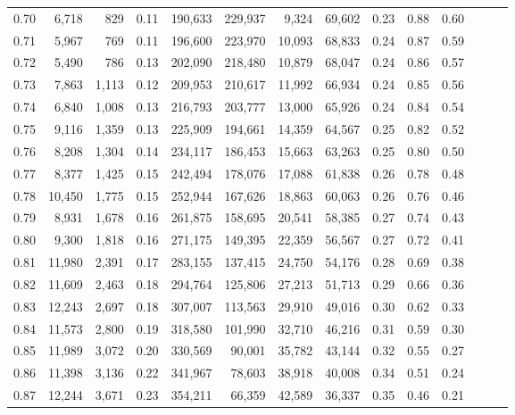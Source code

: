 \begin{tabular}{rrrrrrrrrrrrrr}
0.70 &   6,718 &    829 &  0.11 &  190,633 &  229,937 &   9,324 &  69,602 &  0.23 &  0.88 &      0.60 \\
0.71 &   5,967 &    769 &  0.11 &  196,600 &  223,970 &  10,093 &  68,833 &  0.24 &  0.87 &      0.59 \\
0.72 &   5,490 &    786 &  0.13 &  202,090 &  218,480 &  10,879 &  68,047 &  0.24 &  0.86 &      0.57 \\
0.73 &   7,863 &  1,113 &  0.12 &  209,953 &  210,617 &  11,992 &  66,934 &  0.24 &  0.85 &      0.56 \\
0.74 &   6,840 &  1,008 &  0.13 &  216,793 &  203,777 &  13,000 &  65,926 &  0.24 &  0.84 &      0.54 \\
0.75 &   9,116 &  1,359 &  0.13 &  225,909 &  194,661 &  14,359 &  64,567 &  0.25 &  0.82 &      0.52 \\
0.76 &   8,208 &  1,304 &  0.14 &  234,117 &  186,453 &  15,663 &  63,263 &  0.25 &  0.80 &      0.50 \\
0.77 &   8,377 &  1,425 &  0.15 &  242,494 &  178,076 &  17,088 &  61,838 &  0.26 &  0.78 &      0.48 \\
0.78 &  10,450 &  1,775 &  0.15 &  252,944 &  167,626 &  18,863 &  60,063 &  0.26 &  0.76 &      0.46 \\
0.79 &   8,931 &  1,678 &  0.16 &  261,875 &  158,695 &  20,541 &  58,385 &  0.27 &  0.74 &      0.43 \\
0.80 &   9,300 &  1,818 &  0.16 &  271,175 &  149,395 &  22,359 &  56,567 &  0.27 &  0.72 &      0.41 \\
0.81 &  11,980 &  2,391 &  0.17 &  283,155 &  137,415 &  24,750 &  54,176 &  0.28 &  0.69 &      0.38 \\
0.82 &  11,609 &  2,463 &  0.18 &  294,764 &  125,806 &  27,213 &  51,713 &  0.29 &  0.66 &      0.36 \\
0.83 &  12,243 &  2,697 &  0.18 &  307,007 &  113,563 &  29,910 &  49,016 &  0.30 &  0.62 &      0.33 \\
0.84 &  11,573 &  2,800 &  0.19 &  318,580 &  101,990 &  32,710 &  46,216 &  0.31 &  0.59 &      0.30 \\
0.85 &  11,989 &  3,072 &  0.20 &  330,569 &   90,001 &  35,782 &  43,144 &  0.32 &  0.55 &      0.27 \\
0.86 &  11,398 &  3,136 &  0.22 &  341,967 &   78,603 &  38,918 &  40,008 &  0.34 &  0.51 &      0.24 \\
0.87 &  12,244 &  3,671 &  0.23 &  354,211 &   66,359 &  42,589 &  36,337 &  0.35 &  0.46 &      0.21 \\

\end{tabular}
